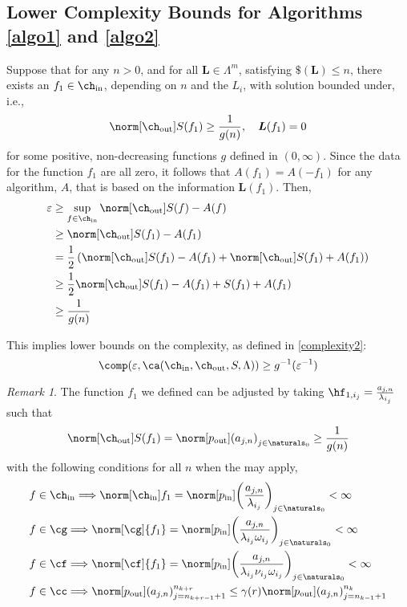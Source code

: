\documentclass[final]{elsarticle}
\newcommand{\chin}{\ch_{\text{\rm{in}}}}
\newcommand{\chout}{\ch_{\text{\rm{out}}}}
\newcommand{\pin}{p_{\text{\rm{in}}}}
\newcommand{\pout}{p_{\text{\rm{out}}}}
\theoremstyle{definition}
\theoremstyle{remark}
\newtheorem{rem}{Remark}
\begin{document}
\subsection{Lower Complexity Bounds for Algorithms \ref{algo1} and \ref{algo2}}

Suppose that for any $n > 0$, and for all $\boldsymbol{L}\in\Lambda^m$, satisfying $\$(\boldsymbol{L})\le n$, there exists an $f_1\in\chin$, depending on $n$ and the $L_i$, with solution bounded under, i.e.,
\begin{equation}
\norm[\chout]{S(f_1)}\ge \frac{1}{g(n)},\quad \boldsymbol{L}(f_1)=0
\end{equation}
for some positive, non-decreasing functions $g$ defined in $(0,\infty)$. Since the data for the function $f_1$ are all zero, it follows that $A(f_1)=A(-f_1)$ for any algorithm, $A$, that is based on the information $\boldsymbol{L}(f_1)$. Then,
\begin{align*}
\varepsilon & \ge \sup_{f\in\chin}\norm[\chout]{S(f)-A(f)}\\
& \ge \norm[\chout]{S(f_1)-A(f_1)}\\
& = \frac{1}{2}\left(\norm[\chout]{S(f_1)-A(f_1)}+\norm[\chout]{S(f_1)+A(f_1)}\right)\\
& \ge \frac{1}{2}\norm[\chout]{S(f_1)-A(f_1)+S(f_1)+A(f_1)}\\
& \ge \frac{1}{g(n)}
\end{align*}

This implies lower bounds on the complexity, as defined in \ref{complexity2}:
\begin{equation*}
\comp(\varepsilon,\ca(\chin,\chout,S,\Lambda))\ge g^{-1}(\varepsilon^{-1})
\end{equation*}

\begin{rem}
The function $f_1$ we defined can be adjusted by taking $\hf_{1,{i_j}}=\frac{a_{j,n}}{\lambda_{i_j}}$ such that
\begin{equation*}
\norm[\chout]{S(f_1)}=\norm[\pout]{\left(a_{j,n}\right)_{j\in\naturals_0}}\ge \frac{1}{g(n)}
\end{equation*}
with the following conditions for all $n$ when the may apply,
\begin{align*}
f&\in\chin\Longrightarrow\norm[\chin]{f_1}=\norm[\pin]{\left(\frac{a_{j,n}}{\lambda_{i_j}}\right)_{j\in\naturals_0}}<\infty\\
f&\in\cg\Longrightarrow\norm[\cg]{f_1}=\norm[\pin]{\left(\frac{a_{j,n}}{\lambda_{i_j}\omega_{i_j}}\right)_{j\in\naturals_0}}<\infty\\
f&\in\cf\Longrightarrow\norm[\cf]{f_1}=\norm[\pin]{\left(\frac{a_{j,n}}{\lambda_{i_j}\nu_{i_j}\omega_{i_j}}\right)_{j\in\naturals_0}}<\infty\\
f&\in\cc\Longrightarrow\norm[\pout]{\left(a_{j,n}\right)_{j=n_{k+r-1}+1}^{n_{k+r}}}\le\gamma(r)\norm[\pout]{\left(a_{j,n}\right)_{j=n_{k-1}+1}^{n_{k}}}
\end{align*}
\end{rem}
\end{document}
